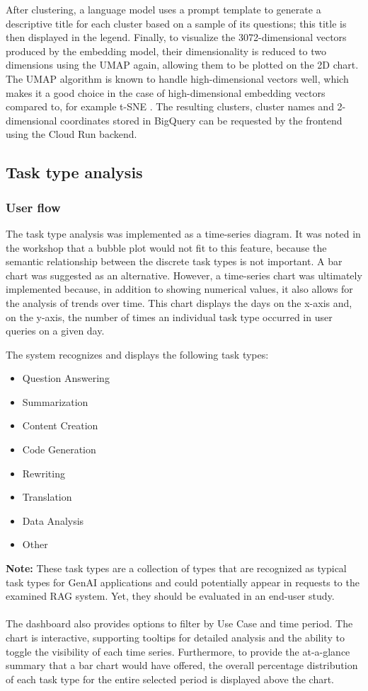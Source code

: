 \documentclass[
	english,
	ruledheaders=section,%
	class=report,%
	thesis={type=bachelor},%
	accentcolor=1b,%
	custommargins=true,%
	marginpar=false,%
	parskip=half-,%
	fontsize=11pt,%
	DIV=14,
]{tudapub}
\begin{document}
After clustering, a language model uses a prompt template to generate a descriptive title for each cluster based on a sample of its questions; this title is then displayed in the legend. Finally, to visualize the 3072-dimensional vectors produced by the embedding model, their dimensionality is reduced to two dimensions using the UMAP again, allowing them to be plotted on the 2D chart. The UMAP algorithm is known to handle high-dimensional vectors well, which makes it a good choice in the case of high-dimensional embedding vectors compared to, for example t-SNE \parencite[pp.~51]{McInnes2020}.
The resulting clusters, cluster names and 2-dimensional coordinates stored in BigQuery can be requested by the frontend using the Cloud Run backend.
\subsection{Task type analysis}
\subsubsection{User flow}
The task type analysis was implemented as a time-series diagram. It was noted in the workshop that a bubble plot would not fit to this feature, because the semantic relationship between the discrete task types is not important. A bar chart was suggested as an alternative. However, a time-series chart was ultimately implemented because, in addition to showing numerical values, it also allows for the analysis of trends over time. This chart displays the days on the x-axis and, on the y-axis, the number of times an individual task type occurred in user queries on a given day.

The system recognizes and displays the following task types:
\begin{itemize}
    \item Question Answering
    \item Summarization
    \item Content Creation
    \item Code Generation
    \item Rewriting
    \item Translation
    \item Data Analysis
    \item Other
\end{itemize}
\textbf{Note:} These task types are a collection of types that are recognized as typical task types for GenAI applications and could potentially appear in requests to the examined RAG system. Yet, they should be evaluated in an end-user study.\\
\\
The dashboard also provides options to filter by Use Case and time period. The chart is interactive, supporting tooltips for detailed analysis and the ability to toggle the visibility of each time series. Furthermore, to provide the at-a-glance summary that a bar chart would have offered, the overall percentage distribution of each task type for the entire selected period is displayed above the chart.
\end{document}
